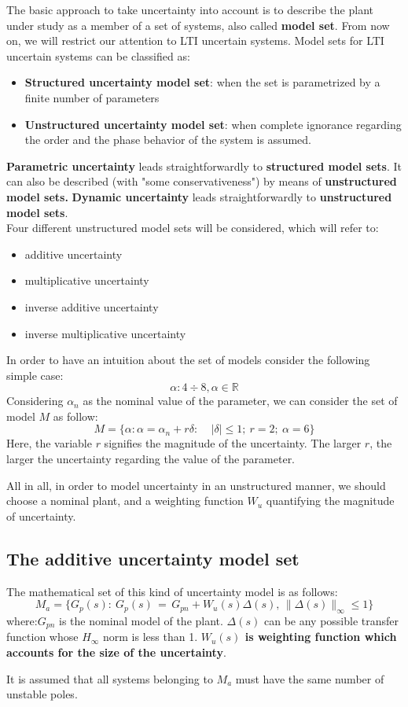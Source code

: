 The basic approach to take uncertainty into account is to describe the plant under study as a member of a set of systems, also called \textbf{model set}. From now on, we will restrict our attention to LTI uncertain systems. Model sets for LTI uncertain systems can be classified as:
\begin{itemize}
    \item \textbf{Structured uncertainty model set}: when the set is parametrized by a finite number of parameters
    \item \textbf{Unstructured uncertainty model set}: when complete ignorance regarding the order and the phase behavior of the system is assumed.
\end{itemize}

\textbf{Parametric uncertainty} leads straightforwardly to \textbf{structured model sets}. It can also be described (with "some conservativeness") by means of \textbf{unstructured model sets.} \textbf{Dynamic uncertainty} leads straightforwardly to \textbf{unstructured model sets}.\\

Four different unstructured model sets will be considered, which will refer to:
\begin{itemize}
    \item additive uncertainty
    \item multiplicative uncertainty
    \item inverse additive uncertainty
    \item inverse multiplicative uncertainty
\end{itemize}
\begin{example}
In order to have an intuition about the set of models consider the following simple case:
\[
\alpha: 4\div8, \alpha \in \mathbb{R}
\]
Considering $\alpha_n$ as the nominal value of the parameter, we can consider the set of model $M$ as follow:
\[
M = \{\alpha: \alpha = \alpha_n + r\delta: \:\:\:\:\: |\delta| \leq 1; \: r = 2;\: \alpha = 6\}
\]
Here, the variable $r$ signifies the magnitude of the uncertainty. The larger $r$, the larger the uncertainty regarding the value of the parameter.
\end{example}

All in all, in order to model uncertainty in an unstructured manner, we should choose a nominal plant, and a weighting function $W_u$ quantifying the magnitude of uncertainty.

\subsection{The additive uncertainty model set}
The mathematical set of this kind of uncertainty model is as follows:
\[
M_a = \{G_p(s):\:G_p(s)\,=\,G_{pn}+W_u(s)\Delta(s),\,\|\Delta(s)\|_\infty\leq 1 \}
\]
where:$G_{pn}$ is the nominal model of the plant. $\Delta(s)$ can be any possible transfer function whose $H_\infty$ norm is less than 1. \textbf{$W_u(s)$ is weighting function which accounts for the size of the uncertainty}. 
\begin{QandAbox}
It is assumed that all systems belonging to $M_a$ must have the same number of unstable poles. 
\end{QandAbox}

